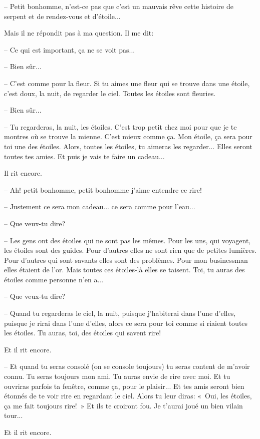 \documentclass[a4paper]{report}
\begin{document}
-- Petit bonhomme, n'est-ce pas que c'est un mauvais rêve cette histoire de serpent et de rendez-vous et d'étoile...

Mais il ne répondit pas à ma question. Il me dit:

-- Ce qui est important, ça ne se voit pas...

-- Bien sûr...

-- C'est comme pour la fleur. Si tu aimes une fleur qui se trouve dans une étoile, c'est doux, la nuit, de regarder le ciel. Toutes les étoiles sont fleuries.

-- Bien sûr...

-- Tu regarderas, la nuit, les étoiles. C'est trop petit chez moi pour que je te montres où se trouve la mienne. C'est mieux comme ça. Mon étoile, ça sera pour toi une des étoiles. Alors, toutes les étoiles, tu aimeras les regarder... Elles seront toutes tes amies. Et puis je vais te faire un cadeau...

Il rit encore.

-- Ah! petit bonhomme, petit bonhomme j'aime entendre ce rire!

-- Justement ce sera mon cadeau... ce sera comme pour l'eau...

-- Que veux-tu dire?

-- Les gens ont des étoiles qui ne sont pas les mêmes. Pour les uns, qui voyagent, les étoiles sont des guides. Pour d'autres elles ne sont rien que de petites lumières. Pour d'autres qui sont savants elles sont des problèmes. Pour mon businessman elles étaient de l'or. Mais toutes ces étoiles-là elles se taisent. Toi, tu auras des étoiles comme personne n'en a...

-- Que veux-tu dire?

-- Quand tu regarderas le ciel, la nuit, puisque j'habiterai dans l'une d'elles, puisque je rirai dans l'une d'elles, alors ce sera pour toi comme si riaient toutes les étoiles. Tu auras, toi, des étoiles qui savent rire!

Et il rit encore.

-- Et quand tu seras consolé (on se console toujours) tu seras content de m'avoir connu. Tu seras toujours mon ami. Tu auras envie de rire avec moi. Et tu ouvriras parfois ta fenêtre, comme ça, pour le plaisir... Et tes amis seront bien étonnés de te voir rire en regardant le ciel. Alors tu leur diras: «~Oui, les étoiles, ça me fait toujours rire!~» Et ils te croiront fou. Je t'aurai joué un bien vilain tour...

Et il rit encore.
\end{document}
